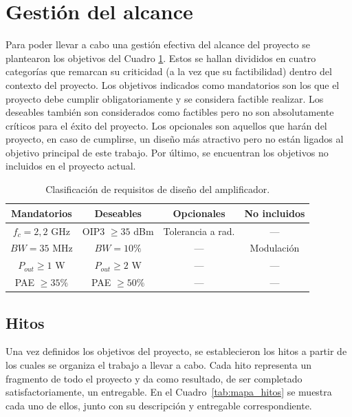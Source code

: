 \section{Gestión del alcance}
Para poder llevar a cabo una gestión efectiva del alcance del proyecto se plantearon los objetivos del Cuadro \ref{tab:requisitos_clasificados}. Estos se hallan divididos en cuatro categorías que remarcan su criticidad (a la vez que su factibilidad) dentro del contexto del proyecto. Los objetivos indicados como mandatorios son los que el proyecto debe cumplir obligatoriamente y se considera factible realizar. Los deseables también son considerados como factibles pero no son absolutamente críticos para el éxito del proyecto. Los opcionales son aquellos que harán del proyecto, en caso de cumplirse, un diseño más atractivo pero no están ligados al objetivo principal de este trabajo. Por último, se encuentran los objetivos no incluidos en el proyecto actual.

\begin{table}[H]
    \centering
    \caption{Clasificación de requisitos de diseño del amplificador.}
    \label{tab:requisitos_clasificados}
    \renewcommand{\arraystretch}{1.1}
    \begin{tabular}{cccc}
        \hline\hline
        \textbf{Mandatorios} & \textbf{Deseables} & \textbf{Opcionales} & \textbf{No incluidos} \\
        \hline
        $f_{c} = 2{,}2$ GHz  & OIP3 $\ge 35$ dBm  & Tolerancia a rad.   & ---        \\
        $BW = 35$ MHz        & $BW = 10 \%$       & ---                 & Modulación \\
        $P_{out} \ge 1$ W    & $P_{out} \ge 2$ W  & ---                 & ---        \\
        PAE $\ge 35 \%$      & PAE $\ge 50 \%$    & ---                 & ---        \\
        \hline\hline
    \end{tabular}
\end{table}

\subsection{Hitos}
Una vez definidos los objetivos del proyecto, se establecieron los hitos a partir de los cuales se organiza el trabajo a llevar a cabo. Cada hito representa un fragmento de todo el proyecto y da como resultado, de ser completado satisfactoriamente, un entregable. En el Cuadro~\ref{tab:mapa_hitos} se muestra cada uno de ellos, junto con su descripción y entregable correspondiente.


